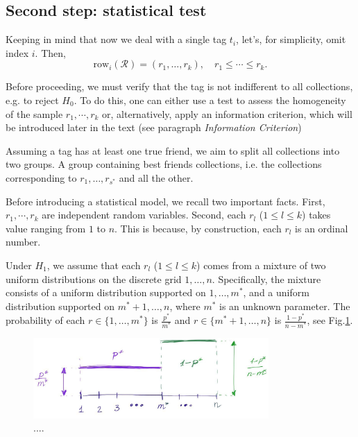 \documentclass{llncs}
\begin{document}
\subsection*{Second step: statistical test}
Keeping in mind that now we deal with a single tag $t_i$, let's, for simplicity, omit index $i$. Then, 
\[
\text{row}_{i}(\mathcal{R}) = (r_{1}, \dots, r_{k}), 
\quad
r_{1} \le \cdots \le r_{k}.
\]

Before proceeding, we must verify that the tag is not indifferent to all collections, e.g. to reject $H_0$. To do this, one can either use a test to assess the homogeneity of the sample $r_{1}, \cdots, r_{k}$ or, alternatively, apply an information criterion, which will be introduced later in the text (see paragraph \textit{Information Criterion})

Assuming a tag has at least one true friend, we aim to split all collections into two groups. A group containing best friends collections, i.e. the collections corresponding to $r_1, \dots, r_{s^*}$ and all the other.

Before introducing a statistical model, we recall two important facts. First, $r_{1}, \cdots, r_{k}$ are independent random variables. Second, each $r_l$ ($1\le l \le k$) takes value ranging from $1$ to $n$. This is because, by construction, each $r_l$ is an ordinal number.

Under $H_1$, we assume that each $r_l$ ($1\le l \le k$) comes from a mixture of two uniform distributions on the discrete grid $1, \dots, n$.
Specifically, the mixture consists of a uniform distribution supported on $1, \dots, m^*$, and a uniform distribution supported on $m^* + 1, \dots, n$, where $m^*$ is an unknown parameter. The probability of each $r \in \{1, \dots, m^*\}$ is $\frac{p^{*}}{m^*}$ and $r \in \{ m^*+1, \dots, n\}$ is $\frac{1 - p^{*}}{n - m^*}$,
see Fig.\ref{fig:model}.
\begin{figure}
 \centering
\includegraphics[width=0.8\textwidth]{model.jpeg}
 \caption{....}
 \label{fig:model}
\end{figure}
\end{document}
